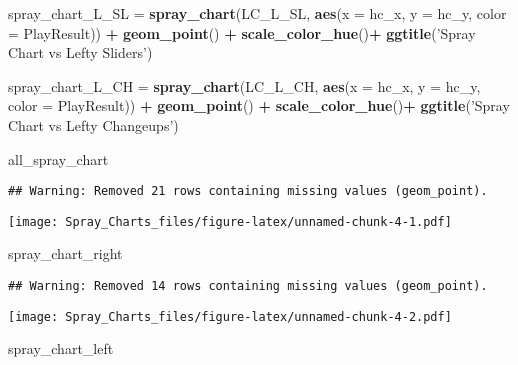 \documentclass[]{article}
\newenvironment{Shaded}{\begin{snugshade}}{\end{snugshade}}
\newcommand{\KeywordTok}[1]{\textcolor[rgb]{0.13,0.29,0.53}{\textbf{#1}}}
\newcommand{\DataTypeTok}[1]{\textcolor[rgb]{0.13,0.29,0.53}{#1}}
\newcommand{\StringTok}[1]{\textcolor[rgb]{0.31,0.60,0.02}{#1}}
\newcommand{\OperatorTok}[1]{\textcolor[rgb]{0.81,0.36,0.00}{\textbf{#1}}}
\newcommand{\NormalTok}[1]{#1}
\begin{document}
\begin{Shaded}
\begin{Highlighting}[]
\NormalTok{spray_chart_L_SL =}\StringTok{ }\KeywordTok{spray_chart}\NormalTok{(LC_L_SL, }\KeywordTok{aes}\NormalTok{(}\DataTypeTok{x =}\NormalTok{ hc_x, }\DataTypeTok{y =}\NormalTok{ hc_y, }\DataTypeTok{color =}\NormalTok{ PlayResult)) }\OperatorTok{+}
\StringTok{  }\KeywordTok{geom_point}\NormalTok{() }\OperatorTok{+}
\StringTok{  }\KeywordTok{scale_color_hue}\NormalTok{()}\OperatorTok{+}
\StringTok{  }\KeywordTok{ggtitle}\NormalTok{(}\StringTok{'Spray Chart vs Lefty Sliders'}\NormalTok{)}

\NormalTok{spray_chart_L_CH =}\StringTok{ }\KeywordTok{spray_chart}\NormalTok{(LC_L_CH, }\KeywordTok{aes}\NormalTok{(}\DataTypeTok{x =}\NormalTok{ hc_x, }\DataTypeTok{y =}\NormalTok{ hc_y, }\DataTypeTok{color =}\NormalTok{ PlayResult)) }\OperatorTok{+}
\StringTok{  }\KeywordTok{geom_point}\NormalTok{() }\OperatorTok{+}
\StringTok{  }\KeywordTok{scale_color_hue}\NormalTok{()}\OperatorTok{+}
\StringTok{  }\KeywordTok{ggtitle}\NormalTok{(}\StringTok{'Spray Chart vs Lefty Changeups'}\NormalTok{)}





\NormalTok{all_spray_chart}
\end{Highlighting}
\end{Shaded}

\begin{verbatim}
## Warning: Removed 21 rows containing missing values (geom_point).
\end{verbatim}

\texttt{[image: Spray\_Charts\_files/figure-latex/unnamed-chunk-4-1.pdf]}

\begin{Shaded}
\begin{Highlighting}[]
\NormalTok{spray_chart_right}
\end{Highlighting}
\end{Shaded}

\begin{verbatim}
## Warning: Removed 14 rows containing missing values (geom_point).
\end{verbatim}

\texttt{[image: Spray\_Charts\_files/figure-latex/unnamed-chunk-4-2.pdf]}

\begin{Shaded}
\begin{Highlighting}[]
\NormalTok{spray_chart_left }
\end{Highlighting}
\end{Shaded}
\end{document}

